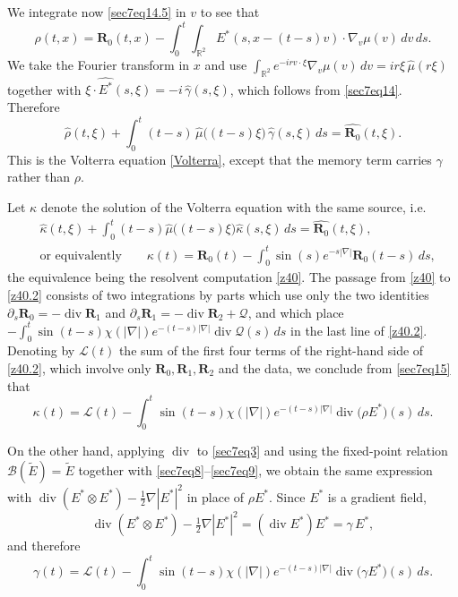 \documentclass[reqno,11pt]{amsart}
\numberwithin{equation}{section}
\def\R{{\mathbb R}}
\def\R{{\bf R}}
\def\R{\mathbb{R}}
\begin{document}
     		We integrate now \eqref{sec7eq14.5} in $v$ to see that
		\[
			\rho(t,x)=\mathbf R_0(t,x)-\int_0^t\!\!\int_{\R^2}
			E^\ast(s,x-(t-s)v)\cdot\nabla_v\mu(v)\,dv\,ds .
		\]
		We take the Fourier transform in $x$ and use
		$\int_{\R^2}e^{-ir v\cdot\xi}\nabla_v\mu(v)\,dv=ir\xi\,\widehat\mu(r\xi)$ together with
		$\xi\cdot\widehat{E^\ast}(s,\xi)=-i\,\widehat{\gamma}(s,\xi)$, which follows from
		\eqref{sec7eq14}. Therefore
		\begin{equation}\label{sec7eq16}
			\widehat\rho(t,\xi)
			+\int_0^t(t-s)\,\widehat\mu\bigl((t-s)\xi\bigr)\,
			\widehat{\gamma}(s,\xi)\,ds
			=\widehat{\mathbf R_0}(t,\xi).
		\end{equation}
		This is the Volterra equation \eqref{Volterra}, except that the memory term carries
		$\gamma$ rather than $\rho$.

		Let $\kappa$ denote the solution of the Volterra equation with the same source, i.e.
		\begin{equation}\label{sec7eq17}
		\begin{split}
			&\widehat{\kappa}(t,\xi)+\int_0^t(t-s)\widehat\mu\bigl((t-s)\xi\bigr)\widehat{\kappa}(s,\xi)\,ds
			=\widehat{\mathbf R_0}(t,\xi),\\
			&\text{or equivalently}\qquad
			\kappa(t)=\mathbf R_0(t)-\int_0^t\sin(s)e^{-s|\nabla|}\mathbf R_0(t-s)\,ds,
		\end{split}
		\end{equation}
		the equivalence being the resolvent computation \eqref{z40}. The passage from \eqref{z40}
		to \eqref{z40.2} consists of two integrations by parts which use only the two identities
		$\partial_s\mathbf R_0=-\operatorname{div}\mathbf R_1$ and
		$\partial_s\mathbf R_1=-\operatorname{div}\mathbf R_2+\mathcal Q$, and which place
		$-\int_0^t\sin(t-s)\chi(|\nabla|)e^{-(t-s)|\nabla|}\operatorname{div}\mathcal Q(s)\,ds$ in the last line
		of \eqref{z40.2}. Denoting by $\mathcal L(t)$ the sum of the first four terms of the
		right-hand side of \eqref{z40.2}, which involve only $\mathbf R_0,\mathbf R_1,\mathbf R_2$
		and the data, we conclude from \eqref{sec7eq15} that
		\begin{equation}\label{sec7eq18}
			\kappa(t)=\mathcal L(t)
			-\int_0^t\sin(t-s)\chi(|\nabla|)e^{-(t-s)|\nabla|}\operatorname{div}\bigl(\rho E^\ast\bigr)(s)\,ds .
		\end{equation}
		
		On the other hand, applying $\operatorname{div}$ to \eqref{sec7eq3} and using the fixed-point
		relation $\mathcal B(\widetilde E)=\widetilde E$ together with
		\eqref{sec7eq8}--\eqref{sec7eq9}, we obtain the same expression with
		$\operatorname{div}(E^\ast\otimes E^\ast)-\frac12\nabla|E^\ast|^2$ in place of
		$\rho E^\ast$. Since $E^\ast$ is a gradient field,
		\[
			\operatorname{div}(E^\ast\otimes E^\ast)-\tfrac12\nabla|E^\ast|^2
			=(\operatorname{div}E^\ast)E^\ast=\gamma\,E^\ast ,
		\]
		and therefore
		\begin{equation}\label{sec7eq19}
			\gamma(t)=\mathcal L(t)
			-\int_0^t\sin(t-s)\chi(|\nabla|)e^{-(t-s)|\nabla|}\operatorname{div}\bigl(\gamma E^\ast\bigr)(s)\,ds .
		\end{equation}
\end{document}

